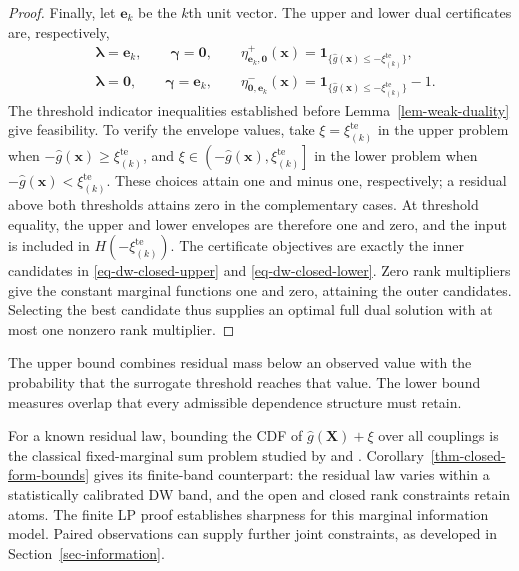 \documentclass[review,11pt,3p,authoryear,nopreprintline]{elsarticle}
\begin{document}
\begin{proof}
  Finally, let $\bm e_k$ be the $k$th unit vector. The upper and lower dual certificates are, respectively,
  \begin{align*}
    &\bm\lambda=\bm e_k,\qquad \bm\gamma=\bm 0,\qquad
      \eta^+_{\bm e_k,\bm 0}(\bm x)
      =\mathbf1_{\{\hat g(\bm x)\le-\xi_{(k)}^{\mathrm{te}}\}},\\
    &\bm\lambda=\bm 0,\qquad \bm\gamma=\bm e_k,\qquad
      \eta^-_{\bm 0,\bm e_k}(\bm x)
      =\mathbf1_{\{\hat g(\bm x)\le-\xi_{(k)}^{\mathrm{te}}\}}-1.
  \end{align*}
  The threshold indicator inequalities established before Lemma~\ref{lem-weak-duality} give feasibility. To verify the envelope values, take $\xi=\xi_{(k)}^{\mathrm{te}}$ in the upper problem when $-\hat g(\bm x)\ge\xi_{(k)}^{\mathrm{te}}$, and $\xi\in\left(-\hat g(\bm x),\xi_{(k)}^{\mathrm{te}}\right]$ in the lower problem when $-\hat g(\bm x)<\xi_{(k)}^{\mathrm{te}}$. These choices attain one and minus one, respectively; a residual above both thresholds attains zero in the complementary cases. At threshold equality, the upper and lower envelopes are therefore one and zero, and the input is included in $H\left(-\xi_{(k)}^{\mathrm{te}}\right)$. The certificate objectives are exactly the inner candidates in \eqref{eq-dw-closed-upper} and \eqref{eq-dw-closed-lower}. Zero rank multipliers give the constant marginal functions one and zero, attaining the outer candidates. Selecting the best candidate thus supplies an optimal full dual solution with at most one nonzero rank multiplier.
\end{proof}

The upper bound combines residual mass below an observed value with the probability that the surrogate threshold reaches that value. The lower bound measures overlap that every admissible dependence structure must retain.

For a known residual law, bounding the CDF of $\hat g(\bm X)+\xi$ over all couplings is the classical fixed-marginal sum problem studied by \citet{M82} and \citet{F.N.S87}. Corollary~\ref{thm-closed-form-bounds} gives its finite-band counterpart: the residual law varies within a statistically calibrated DW band, and the open and closed rank constraints retain atoms. The finite LP proof establishes sharpness for this marginal information model. Paired observations can supply further joint constraints, as developed in Section~\ref{sec-information}.
\end{document}
